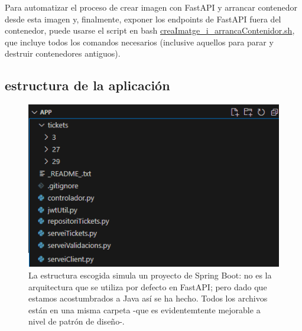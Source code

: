 \documentclass[a4paper,12pt]{report}
\begin{document}
	Para automatizar el proceso de crear imagen con FastAPI y arrancar contenedor desde esta imagen y, finalmente, exponer los endpoints de FastAPI fuera del contenedor, puede usarse el script en bash \href{https://github.com/blackcub3s/mercApp/blob/main/APP%20WEB/__FastAPI__/creaImatge_i_arrancaContenidor.sh}{creaImatge\_i\_arrancaContenidor.sh}, que incluye todos los comandos necesarios (inclusive aquellos para parar y destruir contenedores antiguos).
	
	\subsection{estructura de la aplicación}
	
	\begin{figure}[H]
		\centering
		\caption{La estructura escogida simula un proyecto de Spring Boot: no es la arquitectura que se utiliza por defecto en FastAPI; pero dado que estamos acostumbrados a Java así se ha hecho. Todos los archivos están en una misma carpeta -que es evidentemtente mejorable a nivel de patrón de diseño-.}
		\includegraphics[width=.7\linewidth]{img/estructuraSeguidaFastAPI}

		\label{fig:estructuraseguidafastapi}
	\end{figure}
	
\end{document}
